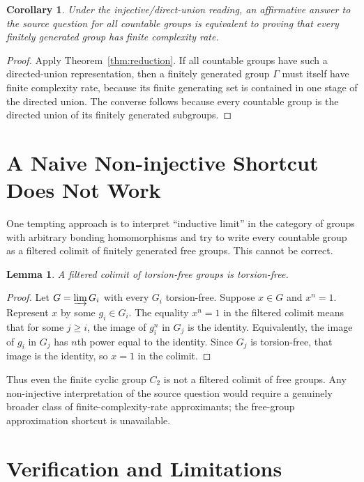 \documentclass[11pt]{article}
\newtheorem{lemma}{Lemma}
\newtheorem{corollary}{Corollary}
\begin{document}
\begin{corollary}
Under the injective/direct-union reading, an affirmative answer to the source question for all countable groups is equivalent to proving that every finitely generated group has finite complexity rate.
\end{corollary}

\begin{proof}
Apply Theorem~\ref{thm:reduction}. If all countable groups have such a directed-union representation, then a finitely generated group $\Gamma$ must itself have finite complexity rate, because its finite generating set is contained in one stage of the directed union. The converse follows because every countable group is the directed union of its finitely generated subgroups.
\end{proof}

\section*{A Naive Non-injective Shortcut Does Not Work}

One tempting approach is to interpret ``inductive limit'' in the category of groups with arbitrary bonding homomorphisms and try to write every countable group as a filtered colimit of finitely generated free groups. This cannot be correct.

\begin{lemma}
A filtered colimit of torsion-free groups is torsion-free.
\end{lemma}

\begin{proof}
Let $G=\varinjlim G_i$ with every $G_i$ torsion-free. Suppose $x\in G$ and $x^n=1$. Represent $x$ by some $g_i\in G_i$. The equality $x^n=1$ in the filtered colimit means that for some $j\geq i$, the image of $g_i^n$ in $G_j$ is the identity. Equivalently, the image of $g_i$ in $G_j$ has $n$th power equal to the identity. Since $G_j$ is torsion-free, that image is the identity, so $x=1$ in the colimit.
\end{proof}

Thus even the finite cyclic group $C_2$ is not a filtered colimit of free groups. Any non-injective interpretation of the source question would require a genuinely broader class of finite-complexity-rate approximants; the free-group approximation shortcut is unavailable.

\section*{Verification and Limitations}
\end{document}
